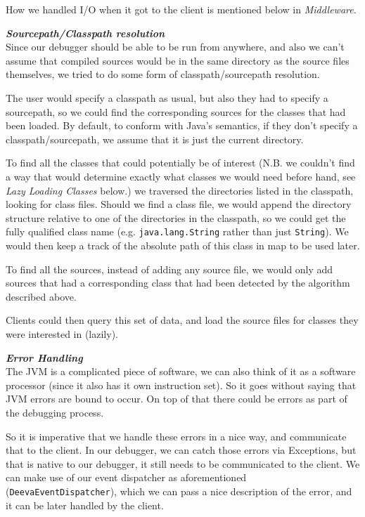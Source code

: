 \documentclass[11pt, a4paper]{article}
\begin{document}
How we handled I/O when it got to the client is mentioned below in \emph{Middleware}.


\textbf{\emph{Sourcepath/Classpath resolution}}\\
Since our debugger should be able to be run from anywhere, and also we can't assume that compiled sources would be in the same directory as the source files themselves, we tried to do some form of classpath/sourcepath resolution.

The user would specify a classpath as usual, but also they had to specify a sourcepath, so we could find the corresponding sources for the classes that had been loaded. 
By default, to conform with Java's semantics, if they don't specify a classpath/sourcepath, we assume that it is just the current directory.

To find all the classes that could potentially be of interest (N.B. we couldn't find a way that would  determine exactly what classes we would need before hand, see \emph{Lazy Loading Classes} below.) we traversed the directories listed in the classpath, looking for class files.
Should we find a class file, we would append the directory structure relative to one of the directories in the classpath, so we could get the fully qualified class name (e.g. \texttt{java.lang.String} rather than just \texttt{String}).
We would then keep a track of the absolute path of this class in map to be used later.

To find all the sources, instead of adding any source file, we would only add sources that had a corresponding class that had been detected by the algorithm described above.

Clients could then query this set of data, and load the source files for classes they were interested in (lazily).

\textbf{\emph{Error Handling}}\\
The JVM is a complicated piece of software, we can also think of it as a software processor (since it also has it own instruction set).
So it goes without saying that JVM errors are bound to occur.
On top of that there could be errors as part of the debugging process.

So it is imperative that we handle these errors in a nice way, and communicate that to the client.
In our debugger, we can catch those errors via Exceptions, but that is native to our debugger, it still needs to be communicated to the client.
We can make use of our event dispatcher as aforementioned (\texttt{DeevaEventDispatcher}), which we can pass a nice description of the error, and it can be later handled by the client.
\end{document}
